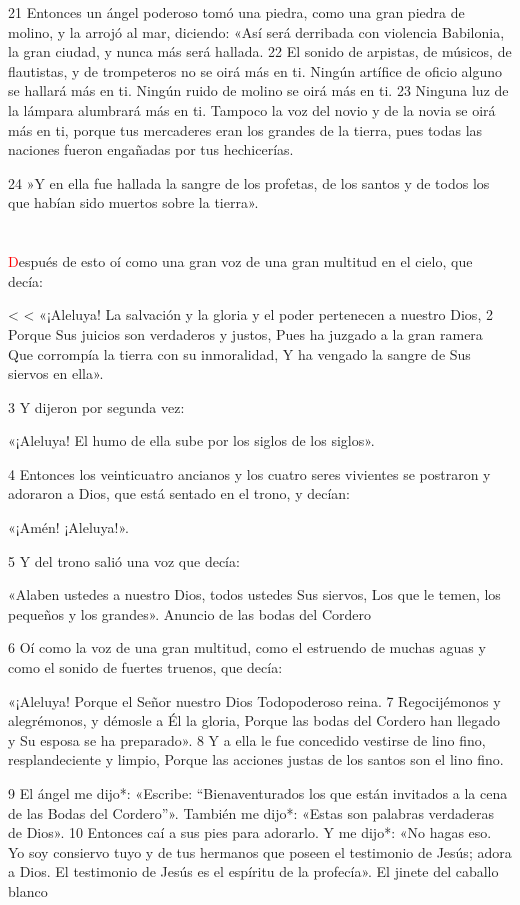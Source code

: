 \documentclass[12pt,twocolumn,twoside]{book}
\makeatletter
\def\zz{%
\ifnum\prevgraf<\c@L@lines
\zzc\z@
\loop
\ifnum\zzc<\prevgraf
\advance\zzc\@ne
\afterassignment\zzda\count@\L@parshape\relax
\repeat
\parshape\L@parshape
\fi}
\def\zzda{\afterassignment\zzdb\dimen@}
\def\zzdb{\afterassignment\zzdef\dimen@}
\def\zzdef#1\relax{\edef\L@parshape{\the\numexpr\count@-1\relax\space #1}}
\makeatother
\begin{document}
21 Entonces un ángel poderoso tomó una piedra, como una gran piedra de molino, y la arrojó al mar, diciendo: «Así será derribada con violencia Babilonia, la gran ciudad, y nunca más será hallada. 22 El sonido de arpistas, de músicos, de flautistas, y de trompeteros no se oirá más en ti. Ningún artífice de oficio alguno se hallará más en ti. Ningún ruido de molino se oirá más en ti. 23 Ninguna luz de la lámpara alumbrará más en ti. Tampoco la voz del novio y de la novia se oirá más en ti, porque tus mercaderes eran los grandes de la tierra, pues todas las naciones fueron engañadas por tus hechicerías.

24 »Y en ella fue hallada la sangre de los profetas, de los santos y de todos los que habían sido muertos sobre la tierra».
\chapter{}
\lettrine[lines=4]{\textcolor{red}{D}}{}espués de esto oí como una gran voz de una gran multitud en el cielo, que decía:

\zz«¡Aleluya!
La salvación y la gloria y el poder pertenecen a nuestro Dios,
2 
Porque Sus juicios son verdaderos y justos,
Pues ha juzgado a la gran ramera
Que corrompía la tierra con su inmoralidad,
Y ha vengado la sangre de Sus siervos en ella».

3 Y dijeron por segunda vez:

«¡Aleluya!
El humo de ella sube por los siglos de los siglos».

4 Entonces los veinticuatro ancianos y los cuatro seres vivientes se postraron y adoraron a Dios, que está sentado en el trono, y decían:

«¡Amén! ¡Aleluya!».

5 Y del trono salió una voz que decía:

«Alaben ustedes a nuestro Dios, todos ustedes Sus siervos,
Los que le temen, los pequeños y los grandes».
Anuncio de las bodas del Cordero

6 Oí como la voz de una gran multitud, como el estruendo de muchas aguas y como el sonido de fuertes truenos, que decía:

«¡Aleluya!
Porque el Señor nuestro Dios Todopoderoso reina.
7 
Regocijémonos y alegrémonos, y démosle a Él la gloria,
Porque las bodas del Cordero han llegado y Su esposa se ha preparado».
8 
Y a ella le fue concedido vestirse de lino fino, resplandeciente y limpio,
Porque las acciones justas de los santos son el lino fino.

9 El ángel me dijo*: «Escribe: “Bienaventurados los que están invitados a la cena de las Bodas del Cordero”». También me dijo*: «Estas son palabras verdaderas de Dios». 10 Entonces caí a sus pies para adorarlo. Y me dijo*: «No hagas eso. Yo soy consiervo tuyo y de tus hermanos que poseen el testimonio de Jesús; adora a Dios. El testimonio de Jesús es el espíritu de la profecía».
El jinete del caballo blanco
\end{document}
